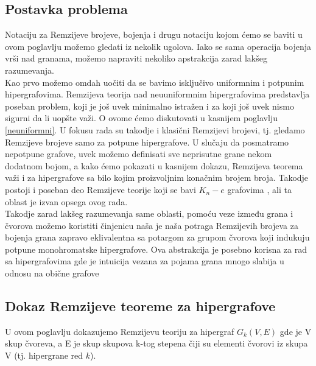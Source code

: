 \documentclass[a4paper]{article}
\begin{document}
	\subsection{Postavka problema}\label{psotavka}
	Notaciju za Remzijeve brojeve, bojenja i drugu notaciju kojom ćemo se baviti u ovom poglavlju možemo gledati iz nekolik ugolova. Iako se sama operacija bojenja vrši nad granama, možemo napraviti nekoliko apstrakcija zarad lakšeg razumevanja.\\
	Kao prvo možemo omdah uočiti da se bavimo isključivo uniformnim i potpunim hipergrafovima. Remzijeva teorija nad neuuniformnim hipergrafovima predstavlja poseban problem, koji je još uvek minimalno istražen i za koji još uvek nismo sigurni da li uopšte važi. O ovome ćemo diskutovati u kasnijem poglavlju \ref{neuniformni}. U fokusu rada su takodje i klasični Remzijevi brojevi, tj. gledamo Remzijeve brojeve samo za potpune hipergrafove. U slučaju da posmatramo nepotpune grafove, uvek možemo definisati sve neprisutne grane nekom dodatnom bojom, a kako ćemo pokazati u kasnijem dokazu, Remzijeva teorema važi i za hipergrafove sa bilo kojim proizvoljnim konačnim brojem broja. Takodje postoji i poseban deo Remzijeve teorije koji se bavi $K_n - e$ grafovima \cite{pregled}, ali ta oblast je izvan opsega ovog rada.\\
	Takodje zarad lakšeg razumevanja same oblasti, pomoću veze između grana i čvorova možemo koristiti činjenicu naša je naša potraga Remzijevih brojeva za bojenja grana zapravo eklivalentna sa potargom za grupom čvorova koji indukuju potpune monohromatske hipergrafove. Ova abstrakcija je posebno korisna za rad sa hipergrafovima gde je intuicija vezana za pojama grana mnogo slabija u odnosu na obične grafove
	\subsection{Dokaz Remzijeve teoreme za hipergrafove}
	U ovom poglavlju dokazujemo Remzijevu teoriju %
	za hipergraf $ G_{k}(V, E)$ gde je V skup čvoreva, a E je skup skupova k-tog stepena čiji su elementi čvorovi iz skupa V (tj. hipergrane red $k$).
	
\end{document}
